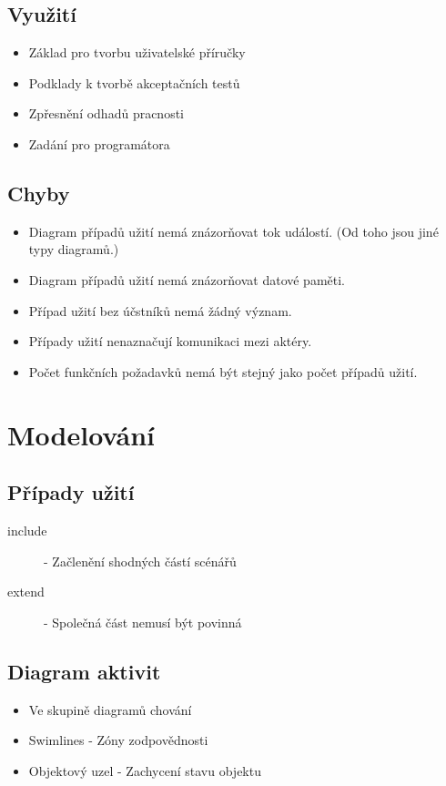 \documentclass{szzclass}
\begin{document}
\subsection{Využití}
\begin{itemize}
\item Základ pro tvorbu uživatelské příručky
\item Podklady k tvorbě akceptačních testů
\item Zpřesnění odhadů pracnosti
\item Zadání pro programátora
\end{itemize}

\subsection{Chyby}
\begin{itemize}
\item Diagram případů užití nemá znázorňovat tok událostí. (Od toho jsou jiné typy diagramů.)
\item Diagram případů užití nemá znázorňovat datové paměti.
\item Případ užití bez účstníků nemá žádný význam.
\item Případy užití nenaznačují komunikaci mezi aktéry.
\item Počet funkčních požadavků nemá být stejný jako počet případů užití.
\end{itemize}

\section{Modelování}
\subsection{Případy užití}
\begin{description}
\item[include] - Začlenění shodných částí scénářů
\item[extend] - Společná část nemusí být povinná
\end{description}

\subsection{Diagram aktivit}
\begin{itemize}
\item Ve skupině diagramů chování
\item Swimlines - Zóny zodpovědnosti
\item Objektový uzel - Zachycení stavu objektu
\end{itemize}
\end{document}
